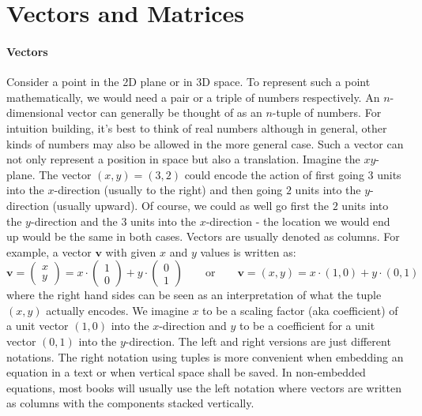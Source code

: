 \section{Vectors and Matrices}

\paragraph{Vectors}
Consider a point in the 2D plane or in 3D space. To represent such a point mathematically, we would need a pair or a triple of numbers respectively. An $n$-dimensional vector can generally be thought of as an $n$-tuple of numbers. For intuition building, it's best to think of real numbers although in general, other kinds of numbers may also be allowed in the more general case. Such a vector can not only represent a position in space but also a translation. Imagine the $xy$-plane. The vector $(x,y) = (3,2)$ could encode the action of first going $3$ units into the $x$-direction (usually to the right) and then going $2$ units into the $y$-direction (usually upward). Of course, we could as well go first the $2$ units into the $y$-direction and the $3$ units into the $x$-direction - the location we would end up would be the same in both cases. Vectors are usually denoted as columns. For example, a vector $\mathbf{v}$ with given $x$ and $y$ values is written as:
\begin{equation}
\mathbf{v} 
= \begin{pmatrix} x \\ y \end{pmatrix} 
=   x \cdot \begin{pmatrix} 1 \\ 0 \end{pmatrix} 
  + y \cdot \begin{pmatrix} 0 \\ 1 \end{pmatrix} 
\qquad \text{or}  \qquad
\mathbf{v} = (x,y) = x \cdot (1, 0) + y \cdot (0, 1)
\end{equation}
where the right hand sides can be seen as an interpretation of what the tuple $(x,y)$ actually encodes. We imagine $x$ to be a scaling factor (aka coefficient) of a unit vector $(1,0)$ into the $x$-direction and $y$ to be a coefficient for a unit vector $(0,1)$ into the $y$-direction. The left and right versions are just different notations. The right notation using tuples is more convenient when embedding an equation in a text or when vertical space shall be saved. In non-embedded equations, most books will usually use the left notation where vectors are written as columns with the components stacked vertically. 

